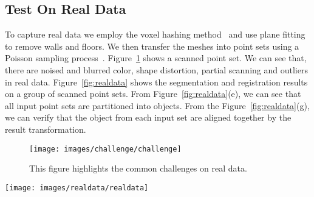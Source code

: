 \subsection{Test On Real Data}
To capture real data we employ the voxel hashing method~\cite{VXH} and use plane fitting to remove walls and floors. 
%
We then transfer the meshes into point sets using a Poisson sampling process~\cite{PossionSampling}.
%
Figure~\ref{fig:challenge} shows a scanned point set. We can see that, there are noised and blurred color, shape distortion, partial scanning and outliers in real data.
%
Figure~{\ref{fig:realdata}} shows the segmentation and registration results on a group of scanned point sets.
From Figure~\ref{fig:realdata}(e), we can see that all input point sets are partitioned into objects. From the Figure~\ref{fig:realdata}(g), we can verify that the object from each input set are aligned together by the result transformation.
\begin{figure}
	\centering
	\texttt{[image: images/challenge/challenge]}
	\caption{\label{fig:challenge}This figure highlights the common challenges on real data.}
\end{figure}
\begin{figure*}
	\centering
	\texttt{[image: images/realdata/realdata]}
	\caption{\label{fig:realdata} Segmentation and registration on real data. (a) Scanned mesh using method in \cite{VXH}. (b) Remove walls and floors by plane fitting. (c) Sampled point set using \cite{PossionSampling}. (d) With roughly placed boxes on only one point set, the points are initially segmented in this one point set. Note that parts of the chair legs are segmented to the table due to the rough box placement by users. (e) Pairs of input point sets and corresponding segmentation results. (f) The final Gaussian centroids for the five objects in the scene. (g) Verification of the registration result by aligning all point sets with respect to each object. The light blue rectangle highlights the object that is aligned together. Except the aligned object, the other objects are placed quite messy since they came from different point sets and have different arrangement relative to the aligned object. %
	}
\end{figure*} 

%
